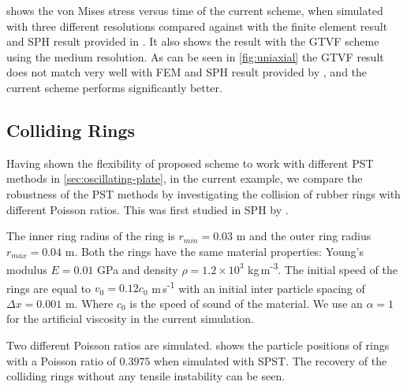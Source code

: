\documentclass[preprint,12pt]{elsarticle}
\begin{document}
 shows the von Mises stress versus time of the current
scheme, when simulated with three different resolutions compared against with
the finite element result and SPH result provided in \cite{das2015evaluation}.
It also shows the result with the GTVF scheme using the medium resolution. As
can be seen in \cref{fig:uniaxial} the GTVF result does not match very well
with FEM and SPH result provided by \citet{das2015evaluation}, and the current
scheme performs significantly better.

%
%
\FloatBarrier%
\subsection{Colliding Rings}
\label{colliding-rings}

Having shown the flexibility of proposed scheme to work with different PST
methods in \cref{sec:oscillating-plate}, in the current example, we compare
the robustness of the PST methods by investigating the collision of rubber
rings with different Poisson ratios. This was first studied in SPH by
\citet{swegle1995smoothed}.

The inner ring radius of the ring is $r_{min} = 0.03$ m and the outer ring
radius $r_{max} = 0.04$ m. Both the rings have the same material properties:
Young's modulus $E = 0.01$ GPa and density $\rho = 1.2 \times 10^{3}$
 kg\,m\textsuperscript{-3}. The initial speed of the rings are equal to
$v_0 = 0.12 c_0$ m\,s\textsuperscript{-1} with an initial inter particle spacing of
$\Delta x = 0.001$ m. Where $c_0$ is the speed of sound of the material. We use
an $\alpha=1$ for the artificial viscosity in the current simulation.

Two different Poisson ratios are simulated. 
shows the particle positions of rings with a Poisson ratio of $0.3975$ when
simulated with SPST. The recovery of the colliding rings without any tensile
instability can be seen.
\end{document}
